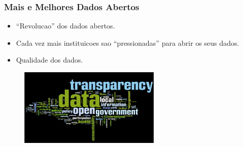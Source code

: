 \documentclass[hyperref={pdfpagelabels=true}]{beamer}
\begin{document}
\begin{frame}
\frametitle{Mais e Melhores Dados Abertos}

      \begin{itemize}         
        \item<1->``Revolucao'' dos dados abertos.%
        \item<2->Cada vez mais instituicoes sao ``pressionadas'' para abrir os seus dados.
        \item<3->Qualidade dos dados.%
       \end{itemize}            
          
        \begin{figure}   
            \includegraphics[width=0.6\textwidth]{woordle.jpeg}\\
        \end{figure} 

\end{frame}
\end{document}
